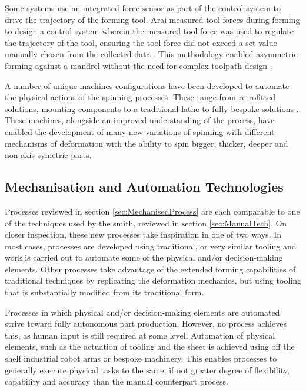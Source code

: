 Some systems use an integrated force sensor as part of the control system to drive the trajectory of the forming tool. 
Arai measured tool forces during forming to design a control system wherein the measured tool force was used to regulate the trajectory of the tool, ensuring the tool force did not exceed a set value manually chosen from the collected data \citep{Arai2003RoboticControl}. 
This methodology enabled asymmetric forming against a mandrel without the need for complex toolpath design \citep{Arai2006Force-controlledMotors}.

A number of unique machines configurations have been developed to automate the physical actions of the spinning processes. These range from retrofitted solutions, mounting components to a traditional lathe \citep{Abd-Alrazzaq2019ARetrofit} to fully bespoke solutions \citep{Music2011FlexibleSpinning}. These machines, alongside an improved understanding of the process, have enabled the development of many new variations of spinning with different mechanisms of deformation \citep{Xia2014ASpinning} with the ability to spin bigger, thicker, deeper and non axis-symetric parts. 
 
 
\subsection{Mechanisation and Automation Technologies} \label{sec:MechandAuto}

Processes reviewed in section \ref{sec:MechanisedProcess} are each comparable to one of the techniques used by the smith, reviewed in section \ref{sec:ManualTech}. On closer inspection, these new processes take inspiration in one of two ways. In most cases, processes are developed using traditional, or very similar tooling and work is carried out to automate some of the physical and/or decision-making elements. Other processes take advantage of the extended forming capabilities of traditional techniques by replicating the deformation mechanics, but using tooling that is substantially modified from its traditional form. 

Processes in which physical and/or decision-making elements are automated strive toward fully autonomous part production. However, no process achieves this, as human input is still required at some level. Automation of physical elements, such as the actuation of tooling and the sheet is achieved using off the shelf industrial robot arms or bespoke machinery. This enables processes to generally execute physical tasks to the same, if not greater degree of flexibility, capability and accuracy than the manual counterpart process. 

